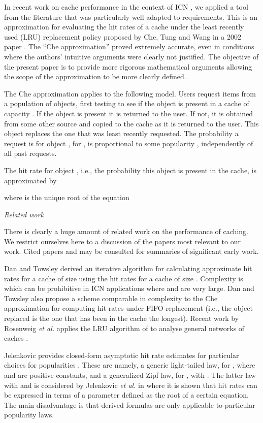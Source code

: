 \documentclass{amsart}
\def\etal{{\em et al. }}
\begin{document}
In recent work on cache performance in the context of ICN \cite{FRRS12}, we applied a tool from the literature that was particularly well adapted to requirements. This is an approximation for evaluating the hit rates of a cache under the least recently used (LRU) replacement policy proposed by Che, Tung and Wang in a 2002 paper  \cite{CTW02}.  The ``Che approximation'' proved extremely accurate, even in conditions where the authors' intuitive arguments were clearly not justified. The objective of the present paper is to provide more rigorous mathematical arguments allowing the scope of the approximation to be more clearly defined.  

The Che approximation applies to the following model. Users request items from a population of  objects, first testing to see if the object is present in a cache of capacity . If the object is present it is returned to the user. If not, it is obtained from some other source and copied to the cache as it is returned to the user. This object replaces the one that was least recently requested. The probability a request is for object , for , is proportional to some popularity , independently of all past requests. 

The hit rate  for object , i.e., the probability this object is present in the cache, is approximated by 

where  is the unique root of the equation




\noindent \emph{Related work}

There is clearly a huge amount of related work on the performance of caching. We restrict ourselves here to a discussion of the papers most relevant to our work. Cited papers \cite{DT90} and \cite{Jelenkovic99} may be consulted for summaries of significant early work. 

Dan and Towsley \cite{DT90} derived an iterative algorithm for calculating approximate hit rates for a cache of size  using the hit rates for a cache of size . Complexity is  which can be prohibitive in ICN applications where  and  are very large.  Dan and Towsley also propose a scheme comparable in complexity to the Che approximation for computing hit rates under FIFO replacement (i.e., the object  replaced is the one that has been in the cache the longest). Recent work by Rosenweig \etal applies the LRU algorithm of \cite{DT90} to analyse general networks of caches \cite{RKT2010}. 

Jelenkovic provides closed-form asymptotic hit rate estimates for particular choices for popularities   \cite{Jelenkovic99}. These are namely, a generic light-tailed law,  for , where  and  are positive constants, and a generalized Zipf law,  for , with . The latter law with  and  is considered by Jelenkovic \etal in \cite{JKR05} where it is shown that hit rates can be expressed in terms of a parameter defined as the root of a certain equation.  The main disadvantage is that derived formulas are only applicable to particular popularity laws.
\end{document}
